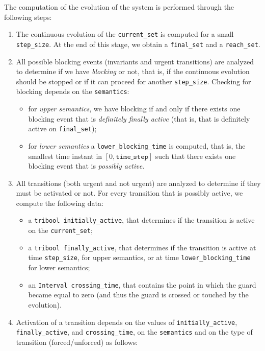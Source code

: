 \documentclass[english,a4paper]{article}
\theoremstyle{theorem}
\theoremstyle{definition}
\theoremstyle{remark}
\begin{document}
The computation of the evolution of the system is performed through the following steps:

\begin{enumerate}
	\item The continuous evolution of the \texttt{current\_set} is computed for a small \texttt{step\_size}. At the end of this stage, we obtain a \texttt{final\_set} and a \texttt{reach\_set}.

	\item All possible blocking events (invariants and urgent transitions) are analyzed to determine if we have \emph{blocking} or not, that is, if the continuous evolution should be stopped or if it can proceed for another \texttt{step\_size}. Checking for blocking depends on the \texttt{semantics}:
		\begin{itemize}
			\item for \emph{upper semantics}, we have blocking if and only if there exists one blocking event that is \emph{definitely finally active} (that is, that is definitely active on \texttt{final\_set});
			\item for \emph{lower semantics} a \texttt{lower\_blocking\_time} is computed, that is, the smallest time instant in $[0, \mathtt{time\_step}]$ such that there exists one blocking event that is \emph{possibly active}.
	\end{itemize}

	\item All transitions (both urgent and not urgent) are analyzed to determine if they must be activated or not. For every transition that is possibly active, we compute the following data:
		\begin{itemize}
			\item a \texttt{tribool initially\_active}, that determines if the transition is active on the \texttt{current\_set};
			\item a \texttt{tribool finally\_active}, that determines if the transition is active at time \texttt{step\_size}, for upper semantics, or at time \texttt{lower\_blocking\_time} for lower semantics;
			\item an \texttt{Interval crossing\_time}, that contains the point in which the guard became equal to zero (and thus the guard is crossed or touched by the evolution).
			\end{itemize}

	\item Activation of a transition depends on the values of \texttt{initially\_active}, \texttt{finally\_active}, and \texttt{crossing\_time}, on the \texttt{semantics} and on the type of transition (forced/unforced) as follows:


\end{enumerate}
\end{document}

